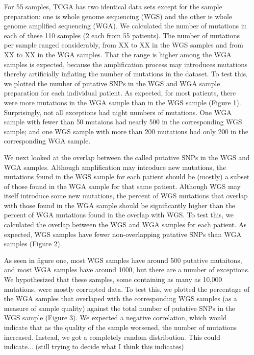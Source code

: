 \documentclass[11pt]{article} %
\begin{document}
For 55 samples, TCGA has two identical data sets except for the sample preparation: one is whole genome sequencing (WGS) and the other is whole genome amplified sequencing (WGA). We calculated the number of mutations in each of these 110 samples (2 each from 55 patients). The number of mutations per sample ranged considerably, from XX to XX in the WGS samples and from XX to XX in the WGA samples. That the range is higher among the WGA samples is expected, because the amplification process may introduces mutations thereby artificially inflating the number of mutations in the dataset. To test this, we plotted the number of putative SNPs in the WGS and WGA sample preparation for each individual patient. As expected, for most patients, there were more mutations in the WGA sample than in the WGS sample (Figure 1). Surprisingly, not all exceptions had night numbers of mutations. One WGA sample with fewer than 50 mutaions had nearly 500 in the corresponding WGS sample; and one WGS sample with more than 200 mutations had only 200 in the corresponding WGA sample.

We next looked at the overlap between the called putative SNPs in the WGS and WGA samples. Although amplification may introduce new mutations, the mutations found in the WGS sample for each patient should be (mostly) a subset of those found in the WGA sample for that same patient. Although WGS may itself introduce some new mutations, the percent of WGS mutations that overlap with those found in the WGA sample should be significantly higher than the percent of WGA mutations found in the overlap with WGS. To test this, we calculated the overlap between the WGS and WGA samples for each patient. As expected, WGS samples have fewer non-overlapping putative SNPs than WGA samples (Figure 2). 

As seen in figure one, most WGS samples have around 500 putative mutaitons, and most WGA samples have around 1000, but there are a number of exceptions. We hypothesized that these samples, some containing as many as 10,000 mutations, were mostly corrupted data. To test this, we plotted the percentage of the WGA samples that overlaped with the corresponding WGS samples (as a measure of sample quality) against the total number of putative SNPs in the WGS sample (Figure 3). We expected a negative correlation, which would indicate that as the quality of the sample worsened, the number of mutations increased. Instead, we got a completely random distribution. This could indicate... (still trying to decide what I think this indicates)
\end{document}
